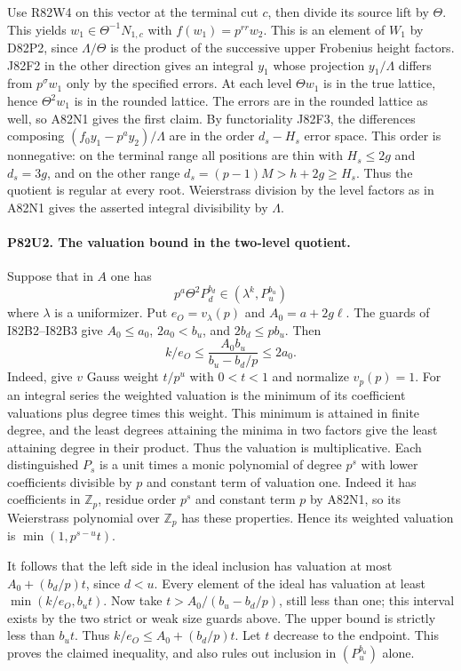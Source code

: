 Use R82W4 on this vector at the terminal cut $c$, then divide its
source lift by $\Theta$. This yields $w_1\in\Theta^{-1}N_{1,c}$
with $f(w_1)=p^{rr}w_2$. This is an element of $W_1$ by D82P2,
since $\Lambda/\Theta$ is the product of the successive upper
Frobenius height factors. J82F2 in the other direction gives
an integral $y_1$ whose projection $y_1/\Lambda$ differs from
$p^\sigma w_1$ only by the specified errors. At each level
$\Theta w_1$ is in the true lattice, hence
$\Theta^2 w_1$ is in the rounded lattice. The errors are in
the rounded lattice as well, so A82N1 gives the first claim.
By functoriality J82F3, the differences composing
$(f_0 y_1-p^a y_2)/\Lambda$ are in the order $d_s-H_s$ error
space. This order is nonnegative: on the terminal range all
positions are thin with $H_s\le2g$ and $d_s=3g$, and on the
other range $d_s=(p-1)M>h+2g\ge H_s$. Thus the quotient is
regular at every root. Weierstrass division by the level factors
as in A82N1 gives the asserted integral divisibility by $\Lambda$.

\paragraph{P82U2. The valuation bound in the two-level quotient.}
Suppose that in $A$ one has
\[
       p^a\Theta^2 P_d^{b_d}\in (\lambda^k,P_u^{b_u})
\]
where $\lambda$ is a uniformizer. Put $e_O=v_\lambda(p)$
and $A_0=a+2g\ell$. The guards of I82B2--I82B3 give
$A_0\le a_0$, $2a_0<b_u$, and $2b_d\le p b_u$. Then
\[
             k/e_O\le \frac{A_0 b_u}{b_u-b_d/p}\le 2a_0 .
\]
Indeed, give $v$ Gauss weight $t/p^u$ with $0<t<1$ and
normalize $v_p(p)=1$. For an integral series the weighted
valuation is the minimum of its coefficient valuations plus
degree times this weight. This minimum is attained in finite
degree, and the least degrees attaining the minima in two
factors give the least attaining degree in their product.
Thus the valuation is multiplicative. Each distinguished
$P_s$ is a unit times a monic polynomial of degree $p^s$ with
lower coefficients divisible by $p$ and constant term of
valuation one. Indeed it has coefficients in $\mathbb Z_p$,
residue order $p^s$ and constant term $p$ by A82N1, so its
Weierstrass polynomial over $\mathbb Z_p$ has these properties.
Hence its weighted valuation is $\min(1,p^{s-u}t)$.

It follows that the left side in the ideal inclusion has valuation
at most $A_0+(b_d/p)t$, since $d<u$. Every element of the ideal
has valuation at least $\min(k/e_O,b_u t)$. Now take
$t>A_0/(b_u-b_d/p)$, still less than one; this interval exists
by the two strict or weak size guards above. The upper bound is
strictly less than $b_u t$. Thus $k/e_O\le A_0+(b_d/p)t$.
Let $t$ decrease to the endpoint. This proves the claimed
inequality, and also rules out inclusion in $(P_u^{b_u})$ alone.

